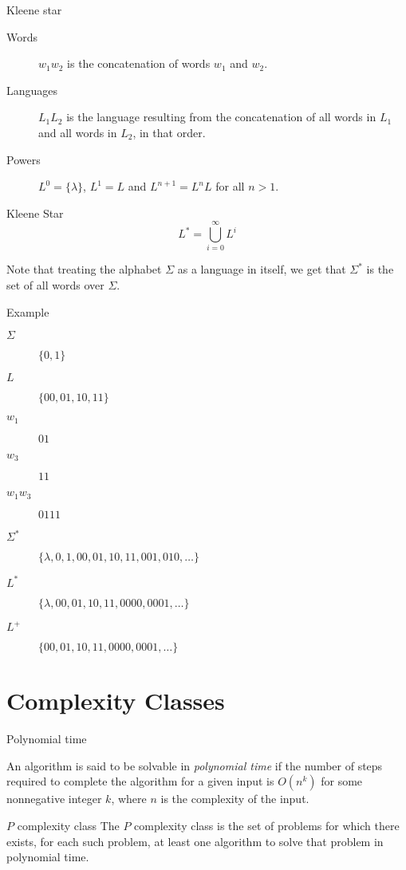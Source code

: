 \begin{frame}{Kleene star}
  \begin{description}
    \item[Words] $w_1 w_2$ is the concatenation of words $w_1$ and $w_2$.
    \item[Languages] $L_1 L_2$ is the language resulting from the concatenation of all words in $L_1$ and all words in $L_2$, in that order.
    \item[Powers] $L^0 = \{ \lambda \}$, $L^1 = L$ and $L^{n+1} = L^n L$ for all $n > 1$.
  \end{description}
  
  \vspace{0.5cm}
  
  \begin{block}{Kleene Star}
     \[ L^* =  \bigcup_{i=0}^{\infty} L^i \]
  \end{block}
  
  Note that treating the alphabet $\Sigma$ as a language in itself, we get that $\Sigma^*$ is the set of all words over $\Sigma$.
\end{frame}

\begin{frame}{Example}
  \begin{description}
    \item[$\Sigma$] $\{ 0, 1 \}$
    \item[$L$] $\{ 00, 01, 10, 11 \}$
    \item[$w_1$] $01$
    \item[$w_3$] $11$
    \item[$w_1 w_3$] $0111$
    \item[$\Sigma^*$] $\{ \lambda, 0, 1, 00, 01, 10, 11, 001, 010, \ldots \}$
    \item[$L^*$] $\{ \lambda, 00, 01, 10, 11, 0000, 0001, \ldots \}$
    \item[$L^+$] $\{ 00, 01, 10, 11, 0000, 0001, \ldots \}$
  \end{description}
\end{frame}

\section{Complexity Classes}

\begin{frame}{Polynomial time}
  \begin{definition}
  An algorithm is said to be solvable in \emph{polynomial time} if the number of steps required to complete the algorithm for a given input is $O(n^k)$ for some nonnegative integer $k$, where $n$ is the complexity of the input.
  \end{definition}
  
  \vspace{0.5cm}
  \begin{block}{$P$ complexity class}
  The $P$ complexity class is the set of problems for which there exists, for each such problem, at least one algorithm to solve that problem in polynomial time.
  \end{block}

\end{frame}

